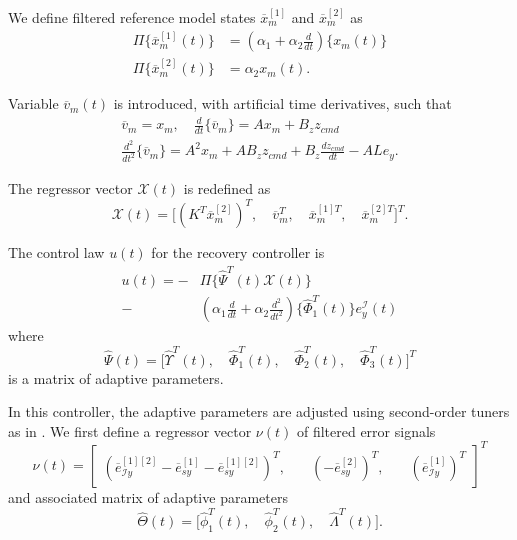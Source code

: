 \documentclass[english]{ifacconf}
\begin{document}
We define filtered reference model states $\overline{x}_m^{[1]}$ and $\overline{x}_m^{[2]}$ as
\begin{equation}
\begin{aligned}
	\Pi \big \{  \overline{x}_{m}^{[1]} (t) \big \} &= (\alpha_1 + \alpha_2 \frac{d}{dt}) \big \{ x_m (t) \big \} \\
	\Pi \big \{  \overline{x}_{m}^{[2]}(t) \big \} &= \alpha_2 x_m (t).
\end{aligned}	
\end{equation}

Variable $\overline{v}_m(t)$ is introduced, with artificial time derivatives, such that
\begin{equation}
\begin{gathered}
	\overline{v}_m = x_m, \quad \frac{d }{dt}\{ \overline{v}_m \} = A x_m + B_z z_{cmd} \\
	\frac{d^2}{dt^2} \{ \overline{v}_m \} = A^2 x_m + A B_z z_{cmd} + B_z \frac{dz_{cmd}}{dt} - A L e_y.
\end{gathered}
\end{equation}

The regressor vector $\mathcal{X}(t)$ is redefined as
\begin{equation}
\mathcal{X}(t) = \big[ (K^T \overline{x}_m^{[2]})^T,\quad \overline{v}_m^T,\quad \overline{x}_m^{[1]T},\quad \overline{x}_m^{[2]T} \big]^T.
\end{equation}

The control law $u(t)$ for the recovery controller is
\begin{equation}
\begin{aligned}
	u (t) = -&\Pi \big \{ \hat{\Psi}^T(t) \mathcal{X}(t) \big \} \\ - & (\alpha_1 \frac{d}{dt} + \alpha_2 \frac{d^2}{dt^2}) \big \{ \hat{\Phi}_1^T(t) \big \} e_y^\mathcal{I} (t) 
\end{aligned} \label{eq:u_rd3}
\end{equation}
where 
\begin{equation}
\hat{\Psi}(t) = \big[ \hat{\Upsilon}^T(t),\quad \hat{\Phi}_1^T(t),\quad \hat{\Phi}_2^T(t),\quad \hat{\Phi}_3^T(t) \big]^T 
\end{equation}
is a matrix of adaptive parameters. 

In this controller, the adaptive parameters are adjusted using second-order tuners as in \cite{qu2016phd}. We first define a regressor vector $\nu(t)$ of filtered error signals
\begin{equation}
	\nu(t) = \begin{bmatrix}
		(\overline{e}_{\mathcal{I}y}^{[1][2]} - \overline{e}_{sy}^{[1]} - \overline{e}_{sy}^{[1][2]})^T, & \quad (-\overline{e}_{sy}^{[2]})^T, & \quad (\overline{e}_{\mathcal{I}y}^{[1]})^T
	\end{bmatrix}^T
\end{equation}
and associated matrix of adaptive parameters
\begin{equation}
\hat{\Theta}(t) = \big[ \hat{\phi}_1^T(t),\quad \hat{\phi}_2^T(t),\quad \hat{\Lambda}^T(t) \big].
\end{equation}
\end{document}
